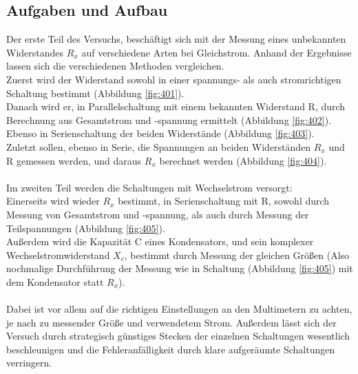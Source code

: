 \documentclass[12pt,a4paper]{article}
\begin{document}
\begin{multicols}{2}
\subsection{Aufgaben und Aufbau}
Der erste Teil des Versuchs, beschäftigt sich mit der Messung eines unbekannten Widerstandes $R_{x}$ auf verschiedene Arten bei Gleichstrom. Anhand der Ergebnisse lassen sich die verschiedenen Methoden vergleichen.\\
Zuerst wird der Widerstand sowohl in einer spannungs- als auch stromrichtigen Schaltung bestimmt (Abbildung \ref{fig:401}).\\
Danach wird er, in Parallelschaltung mit einem bekannten Widerstand R, durch Berechnung aus Gesamtstrom und -spannung ermittelt (Abbildung \ref{fig:402}).\\
Ebenso in Serienschaltung der beiden Widerstände (Abbildung \ref{fig:403}).\\
Zuletzt sollen, ebenso in Serie, die Spannungen an beiden Widerständen $R_{x}$ und R gemessen werden, und daraus $R_{x}$ berechnet werden (Abbildung \ref{fig:404}).\\
\\
Im zweiten Teil werden die Schaltungen mit Wechselstrom versorgt:\\
Einerseits wird wieder $R_{x}$ bestimmt, in Serienschaltung mit R, sowohl durch Messung von Gesamtstrom und -spannung, als auch durch Messung der Teilspannungen (Abbildung \ref{fig:405}).\\
Außerdem wird die Kapazität C eines Kondensators, und sein komplexer Wechselstromwiderstand $X_{c}$, bestimmt durch Messung der gleichen Größen (Also nochmalige Durchführung der Messung wie in Schaltung (Abbildung \ref{fig:405}) mit dem Kondensator statt $R_{x}$).\\
\\
Dabei ist vor allem auf die richtigen Einstellungen an den Multimetern zu achten, je nach zu messender Größe und verwendetem Strom. Außerdem lässt sich der Versuch durch strategisch günstiges Stecken der einzelnen Schaltungen wesentlich beschleunigen und die Fehleranfälligkeit durch klare aufgeräumte Schaltungen verringern.\\
\\
\\


\end{multicols}
\end{document}
